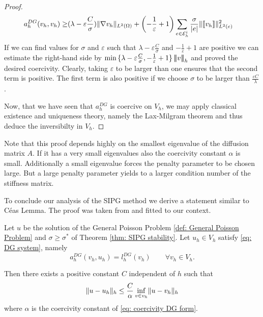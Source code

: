 \begin{proof}
	\begin{align*}
	a_h^{DG}(v_h,v_h)  \geq& (\lambda- \varepsilon \frac C \sigma)
	\lVert \nabla v_h \rVert_{L^2(\Omega)}
	+ \left(-\frac 1 \varepsilon +1\right) \sum_{e\in \mathcal{E}_h^i}  \frac \sigma {|e|} \lVert \llbracket v_h \rrbracket \rVert_{L^2(e)}^2
	\end{align*}
	If we can find values for $\sigma$ and $\varepsilon$ such that $\lambda-\varepsilon \frac C \sigma$ and $-\frac 1 \varepsilon +1$ are positive we can estimate the right-hand side by $\min{\{\lambda-\varepsilon \frac C \sigma,-\frac 1 \varepsilon +1\}} \left| \! \left| \! \left| v \right| \! \right| \! \right|_{h}$ and proved the desired coercivity. 
	Clearly, taking $\varepsilon$ to be larger than one ensures that the second term is positive. The first term is also positive if we choose $\sigma$ to be larger than $\frac {\varepsilon C} \lambda$.
	
	Now, that we have seen that $a_h^{DG}$ is coercive on $V_h$, we may apply classical existence and uniqueness theory, namely the Lax-Milgram theorem and thus deduce the inversibilty in $V_h$.
\end{proof}
Note that this proof depends highly on the smallest eigenvalue of the diffusion matrix $A$. If it has a very small eigenvalues also the coercivity constant $\alpha$ is small.
Additionally a small eigenvalue forces the penalty parameter to be chosen large. But a large penalty parameter yields to a larger condition number of the stiffness matrix.

To conclude our analysis of the SIPG method we derive a statement similar to C\'eas Lemma. The proof was taken from \cite[Lemma 10.5.2]{BS2002} and fitted to our context.
\begin{theorem}\label{thm: error estimate}
	Let $u$ be the solution of the General Poisson Problem \ref{def: General Poisson Problem} and $\sigma \geq \sigma^*$ of Theorem \ref{thm: SIPG stability}. Let $u_h \in V_h$ satisfy \eqref{eq: DG system}, namely
	\[
	a_h^{DG}(v_h, u_h) = l^{DG}_h(v_h) \qquad \forall v_h \in V_h.
	\]
\end{theorem}
Then there exists a positive constant $C$ independent of $h$ such that 
\[
\lVert u - u_h  \rVert_{h} \leq \frac C \alpha \inf_{v \in v_h} \lVert u - v_h \rVert_{h}
\]
where $\alpha$ is the coercivity constant of \eqref{eq: coercivity DG form}. %

